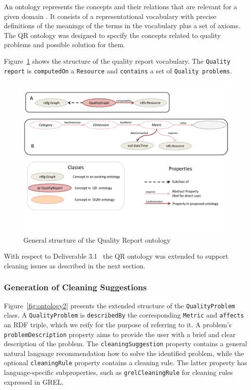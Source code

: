 An ontology represents the concepts and their relations that are relevant for a given domain \cite{Wang05anontology-based}. It consists of a representational vocabulary with precise definitions of the meanings of the terms in the vocabulary plus a set of axioms. The QR ontology was designed to specify the concepts related to quality problems and possible solution for them. 
 
Figure~\ref{fig:ontology1} shows the structure of the quality report vocabulary.
The \texttt{Quality report} is \texttt{computedOn}  a \texttt{Resource} and \texttt{contains}  a set of \texttt{Quality problems}. 

\begin{figure}[ht!]
\centering
\includegraphics[page=5,trim=0.2cm 8.0cm 1.0cm 6.0cm,clip,width=\textwidth]{figures/cleaning.pdf}
\caption{General structure of the Quality Report ontology}
\label{fig:ontology1}
\end{figure}

With respect to Deliverable 3.1~\cite{d3.1} the QR ontology was extended to support cleaning issues as described in the next section.

\subsubsection{Generation of Cleaning Suggestions}
\label{sec:cleaningSuggestions}

Figure~\ref{fig:ontology2} presents the extended structure of the \texttt{QualityProblem} class. 
A \texttt{QualityProblem} is \texttt{describedBy} the corresponding \texttt{Metric} and \texttt{affects} an RDF triple, which we reify for the purpose of referring to it. 
A problem's \texttt{problemDescription} property aims to provide the user with a brief and clear description of the problem.
The \texttt{cleaningSuggestion} property contains a general natural language recommendation how to solve the identified problem, while the optional \texttt{cleaningRule} property contains a cleaning rule.
The latter property has language-specific subproperties, such as \texttt{grelCleaningRule} for cleaning rules expressed in GREL.

